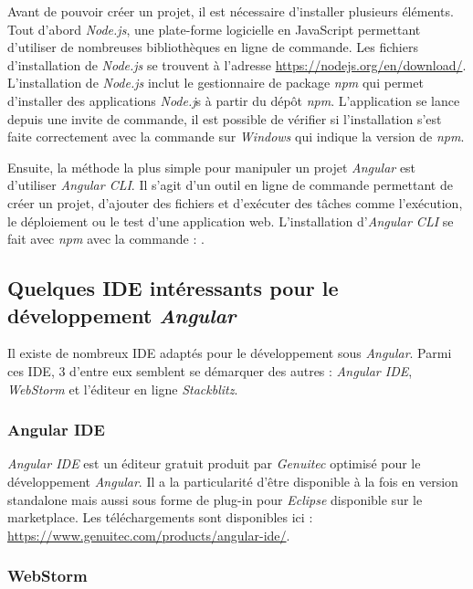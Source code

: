 \documentclass{polytech/polytech}
\begin{document}
Avant de pouvoir créer un projet, il est nécessaire d’installer plusieurs éléments. Tout d’abord \textit{Node.js}, une plate-forme logicielle en JavaScript permettant d’utiliser de nombreuses bibliothèques en ligne de commande. Les fichiers d’installation de \textit{Node.js} se trouvent à l’adresse \url{https://nodejs.org/en/download/}. L’installation de \textit{Node.js} inclut le gestionnaire de package \textit{npm} qui permet d’installer des applications \textit{Node.j}s à partir du dépôt \textit{npm}. L’application se lance depuis une invite de commande, il est possible de vérifier si l’installation s’est faite correctement avec la commande  sur \textit{Windows} qui indique la version de \textit{npm}. 

Ensuite, la méthode la plus simple pour manipuler un projet \textit{Angular} est d’utiliser \textit{Angular CLI}. Il s’agit d’un outil en ligne de commande permettant de créer un projet, d’ajouter des fichiers et d’exécuter des tâches comme l’exécution, le déploiement ou le test d’une application web. L’installation d'\textit{Angular CLI} se fait avec \textit{npm} avec la commande : .

\subsection{Quelques IDE intéressants pour le développement \textit{Angular}}

Il existe de nombreux IDE adaptés pour le développement sous \textit{Angular}. Parmi ces IDE, 3 d’entre eux semblent se démarquer des autres : \textit{Angular IDE}, \textit{WebStorm} et l’éditeur en ligne \textit{Stackblitz}.

\subsubsection{Angular IDE}

\textit{Angular IDE} est un éditeur gratuit produit par \textit{Genuitec} optimisé pour le développement \textit{Angular}. Il a la particularité d’être disponible à la fois en version standalone mais aussi sous forme de plug-in pour \textit{Eclipse} disponible sur le marketplace. Les téléchargements sont disponibles ici : \url{https://www.genuitec.com/products/angular-ide/}. 

\subsubsection{WebStorm}
\end{document}
